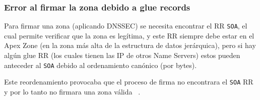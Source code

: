 \subsubsection{Error al firmar la zona debido a glue records}

Para firmar una zona (aplicando DNSSEC) se necesita encontrar el RR \texttt{SOA}, el cual permite verificar que la zona es legítima, y este RR siempre 
debe estar en el Apex Zone (en la zona más alta de la estructura de datos jerárquica), pero si hay algún glue RR 
(los cuales tienen las IP de otros Name Servers) estos pueden anteceder al \texttt{SOA} debido al ordenamiento canónico (por bytes).

Este reordenamiento provocaba que el proceso de firma no encontrara el \texttt{SOA} RR y por lo tanto no firmara una zona válida ~\cite{NLnetLabsBug}.






